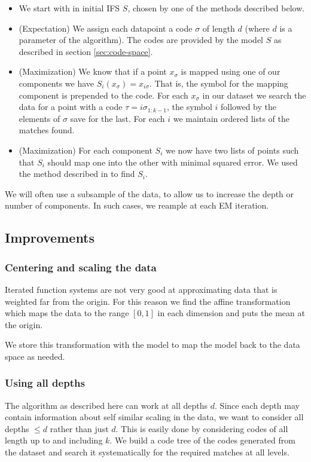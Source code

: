 \documentclass[10pt]{article}
\theoremstyle{definition}
\begin{document}
\begin{itemize}
\item We start with in initial IFS $S$, chosen by one of the methods described below. 
\item (Expectation) We assign each datapoint a code $\sigma$ of length $d$ (where $d$ is a parameter of the algorithm). The codes are provided by the model $S$ as described in section \ref{sec:code-space}. 
\item (Maximization) We know that if a point $x_\sigma$ is mapped using one of our components we have $S_i(x_\sigma) = x_{i\sigma}$. That is, the symbol for the mapping component is prepended to the code. For each $x_\sigma$ in our dataset we search the data for a point with a code $\tau = i\sigma_{1:k-1}$, the symbol $i$ followed by the elements of $\sigma$ save for the last. For each $i$ we maintain ordered lists of the matches found.
\item (Maximization) For each component $S_i$ we now have two lists of points such that $S_i$ should map one into the other with minimal squared error. We used the method described in \cite{umeyama1991least} to find $S_i$. 
\end{itemize}

We will often use a subsample of the data, to allow us to increase the depth or number of components. In such cases, we reample at each EM iteration.
 
\subsection{Improvements}

\subsubsection{Centering and scaling the data}

Iterated function systems are not very good at approximating data that is weighted far from the origin. For this reason we find the affine transformation which maps the data to the range $[0,1]$ in each dimension and puts the mean at the origin.

We store this transformation with the model to map the model back to the data space as needed.

\subsubsection{Using all depths}

The algorithm as described here can work at all depths $d$. Since each depth may contain information about self similar scaling in the data, we want to consider all depths $\leq d$ rather than just $d$. This is easily done by considering codes of all length up to and including $k$. We build a code tree of the codes generated from the dataset and search it systematically for the required matches at all levels.
\end{document}
